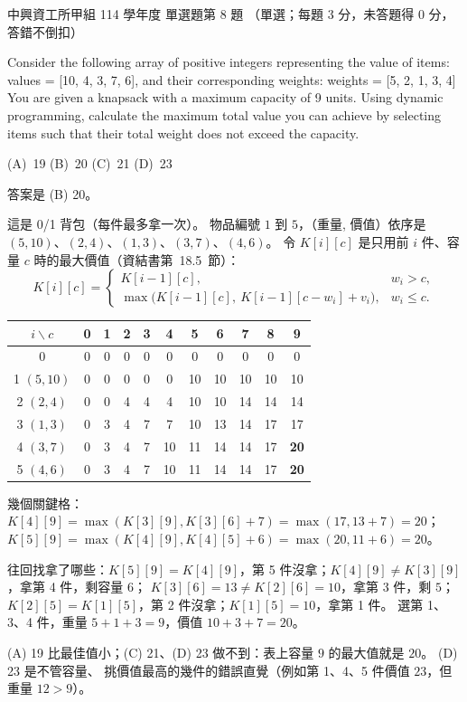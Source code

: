 \begin{pastexam}[label={px:nchu-114-dsa-08}]{中興資工所甲組 114 學年度 單選題第 8 題}
（單選；每題 3 分，未答題得 0 分，答錯不倒扣）

Consider the following array of positive integers representing the value of items:\\
values = [10, 4, 3, 7, 6], and their corresponding weights: weights = [5, 2, 1, 3, 4]\\
You are given a knapsack with a maximum capacity of 9 units. Using dynamic programming, calculate the maximum total value you can achieve by selecting items such that their total weight does not exceed the capacity.

(A)~19 \qquad (B)~20 \qquad (C)~21 \qquad (D)~23
\end{pastexam}

\begin{pastsoln}
答案是 (B) 20。

這是 0/1 背包（每件最多拿一次）。 物品編號 $1$ 到 $5$，（重量, 價值）依序是
$(5, 10)$、$(2, 4)$、$(1, 3)$、$(3, 7)$、$(4, 6)$。
令 $K[i][c]$ 是只用前 $i$ 件、容量 $c$ 時的最大價值（資結書第~18.5~節）：
\[
K[i][c] = \begin{cases} K[i-1][c], & w_i > c, \\ \max\bigl(K[i-1][c],\ K[i-1][c - w_i] + v_i\bigr), & w_i \le c. \end{cases}
\]
\begin{center}
\begin{tabular}{c*{10}{c}}
\toprule
$i \backslash c$ & 0 & 1 & 2 & 3 & 4 & 5 & 6 & 7 & 8 & 9 \\
\midrule
0 & 0 & 0 & 0 & 0 & 0 & 0 & 0 & 0 & 0 & 0 \\
1 $(5, 10)$ & 0 & 0 & 0 & 0 & 0 & 10 & 10 & 10 & 10 & 10 \\
2 $(2, 4)$ & 0 & 0 & 4 & 4 & 4 & 10 & 10 & 14 & 14 & 14 \\
3 $(1, 3)$ & 0 & 3 & 4 & 7 & 7 & 10 & 13 & 14 & 17 & 17 \\
4 $(3, 7)$ & 0 & 3 & 4 & 7 & 10 & 11 & 14 & 14 & 17 & \textbf{20} \\
5 $(4, 6)$ & 0 & 3 & 4 & 7 & 10 & 11 & 14 & 14 & 17 & \textbf{20} \\
\bottomrule
\end{tabular}
\end{center}
幾個關鍵格：$K[4][9] = \max(K[3][9], K[3][6] + 7) = \max(17, 13 + 7) = 20$；
$K[5][9] = \max(K[4][9], K[4][5] + 6) = \max(20, 11 + 6) = 20$。

往回找拿了哪些：$K[5][9] = K[4][9]$，第 5 件沒拿；$K[4][9] \ne K[3][9]$，拿第 4 件，剩容量 $6$；
$K[3][6] = 13 \ne K[2][6] = 10$，拿第 3 件，剩 $5$；$K[2][5] = K[1][5]$，第 2 件沒拿；$K[1][5] = 10$，拿第 1 件。
選第 1、3、4 件，重量 $5 + 1 + 3 = 9$，價值 $10 + 3 + 7 = 20$。

(A) 19 比最佳值小；(C) 21、(D) 23 做不到：表上容量 $9$ 的最大值就是 $20$。 (D) 23 是不管容量、
挑價值最高的幾件的錯誤直覺（例如第 1、4、5 件價值 $23$，但重量 $12 > 9$）。
\end{pastsoln}

